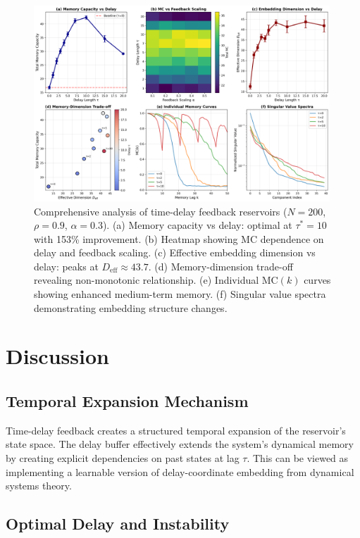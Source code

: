 \documentclass[11pt]{article}
\begin{document}
\begin{figure}[p]
\centering
\includegraphics[width=0.99\textwidth]{comprehensive_analysis.png}
\caption{Comprehensive analysis of time-delay feedback reservoirs ($N=200$, $\rho=0.9$, $\alpha=0.3$). (a) Memory capacity vs delay: optimal at $\tau^*=10$ with 153\% improvement. (b) Heatmap showing MC dependence on delay and feedback scaling. (c) Effective embedding dimension vs delay: peaks at $D_{\text{eff}} \approx 43.7$. (d) Memory-dimension trade-off revealing non-monotonic relationship. (e) Individual MC$(k)$ curves showing enhanced medium-term memory. (f) Singular value spectra demonstrating embedding structure changes.}
\label{fig:comprehensive}
\end{figure}

\section{Discussion}

\subsection{Temporal Expansion Mechanism}

Time-delay feedback creates a structured temporal expansion of the reservoir's state space. The delay buffer effectively extends the system's dynamical memory by creating explicit dependencies on past states at lag $\tau$. This can be viewed as implementing a learnable version of delay-coordinate embedding from dynamical systems theory.

\subsection{Optimal Delay and Instability}
\end{document}
